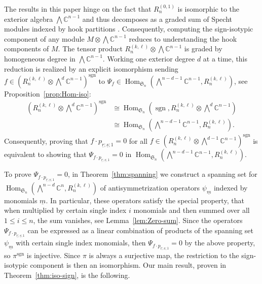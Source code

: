 \documentclass[11pt, reqno]{amsart}
\theoremstyle{definition}
\theoremstyle{remark}
\numberwithin{equation}{section}
\newcommand{\0}{\emptyset}
\newcommand{\C}{\mathbb{C}}
\renewcommand{\S}{\mathfrak{S}}
\newcommand{\m}{\underline{m}}
\renewcommand{\r}{\underline{r}}
\newcommand{\s}{\underline{s}}
\DeclareMathOperator{\sgn}{sgn}
\DeclareMathOperator{\Hom}{Hom}
\begin{document}
The results in this paper hinge on the fact that $R_n^{(0,1)}$ is isomorphic to the exterior algebra 
$\bigwedge \C^{n-1}$ and thus decomposes as a graded sum of Specht modules indexed by hook partitions \cite{HaglundSergel}. 
Consequently, computing the sign-isotypic component of any module 
$M \otimes \bigwedge \C^{n-1}$ reduces to understanding the hook components of $M$. 
The tensor product $R_n^{(k,\ell)} \otimes \bigwedge \C^{n-1}$ is graded by homogeneous degree in $\bigwedge \C^{n-1}$. 
Working one exterior degree $d$ at a time, 
this reduction is realized by an explicit isomorphism sending 
$f \in \left(R_n^{(k,\ell)} \otimes \bigwedge\nolimits^d \C^{n-1}\right)^{\sgn}$ to 
$\Psi_f \in \Hom_{\S_n}\left(\bigwedge\nolimits^{n-d-1}\C^{n-1}, R_n^{(k,\ell)}\right)$, see Proposition~\ref{prop:Hom-iso}:
\begin{equation}\label{eq:INTRO-hook-hom-iso}
\begin{aligned}
    \left(R_n^{(k,\ell)} \otimes \bigwedge\nolimits^d \C^{n-1}\right)^{\sgn} 
    &\cong 
    \Hom_{\S_n}\left(\sgn, R_n^{(k,\ell)} \otimes \bigwedge\nolimits^d \C^{n-1}\right) \\
    &\cong 
    \Hom_{\S_n}\left(\bigwedge\nolimits^{n-d-1}\C^{n-1}, R_n^{(k,\ell)}\right). 
\end{aligned}
\end{equation}
Consequently, proving that $f\cdot p_{\r;\s;1}=0$ for all $f \in \left(R_n^{(k,\ell)} \otimes \bigwedge\nolimits^{d-1} \C^{n-1}\right)^{\sgn}$ is equivalent to showing that $\Psi_{f\cdot p_{\r;\s;1}}=0$ in $\Hom_{\S_n}\left(\bigwedge\nolimits^{n-d-1}\C^{n-1}, R_n^{(k,\ell)}\right)$.

To prove $\Psi_{f\cdot p_{\r;\s;1}}=0$, in Theorem~\ref{thm:spanning} we construct a spanning set 
for $\Hom_{\S_n}\left(\bigwedge\nolimits^{n-d}\C^{n}, R_n^{(k,\ell)}\right)$ of antisymmetrization operators 
$\psi_{\m}$ indexed by monomials $\m$. 
In particular, these operators satisfy the special property,
that when multiplied by certain single index $i$ monomials and then summed over all $1\leq i \leq n$, 
the sum vanishes, see Lemma~\ref{lem:Zero-sum}.
Since the operators $\Psi_{f\cdot p_{\r;\s;1}}$ can be expressed as 
a linear combination of products of the spanning set $\psi_{\m}$ with certain single index monomials, 
then $\Psi_{f\cdot p_{\r;\s;1}}=0$ by the above property, so $\pi^{\sgn}$ is injective. 
Since $\pi$ is always a surjective map, the restriction to the sign-isotypic component is then an isomorphism.
Our main result, proven in Theorem~\ref{thm:iso-sign}, is the following. 
\end{document}
